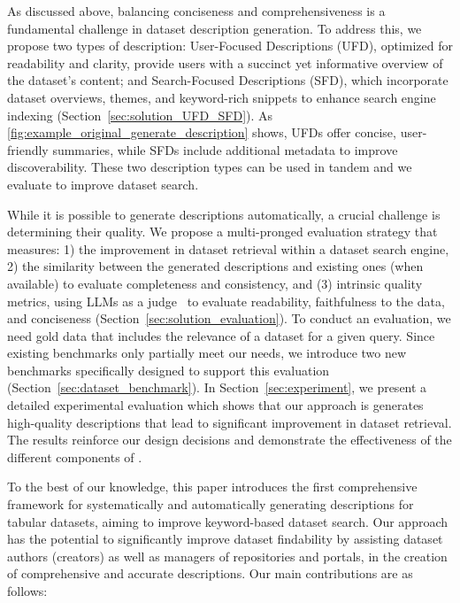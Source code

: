As discussed above, balancing conciseness and comprehensiveness is a fundamental challenge in dataset description generation. To address this, we propose two types of description: User-Focused Descriptions (UFD),
optimized for readability and clarity, provide users with a succinct yet informative overview of the dataset’s content; and Search-Focused Descriptions (SFD), which incorporate dataset overviews, themes, and keyword-rich snippets to enhance search engine indexing (Section~\ref{sec:solution_UFD_SFD}). As \autoref{fig:example_original_generate_description} shows,
UFDs offer concise, user-friendly summaries, while SFDs include additional metadata to improve discoverability.
These two description types can be used in tandem and we evaluate to improve dataset search.

While it is possible to generate descriptions automatically, a crucial challenge is determining their quality.
%
We propose a multi-pronged evaluation strategy that measures: 1)  the improvement in dataset
retrieval within a dataset search engine, 2) the similarity between the generated
descriptions and existing ones (when available) to evaluate completeness and consistency, and (3) intrinsic quality metrics, using LLMs as a judge~\cite{liu2023geval, gao2024llmEval, seo2024unveiling, zhao2023investigating} to evaluate readability, faithfulness to the data,
and conciseness (Section~\ref{sec:solution_evaluation}). 
% 
To conduct an evaluation, we need gold data that includes the relevance of a dataset for a given query. 
% 
% 
% 
Since existing benchmarks only partially meet our needs, we introduce two new benchmarks specifically designed to support this evaluation (Section~\ref{sec:dataset_benchmark}).
%
In Section~\ref{sec:experiment}, we present a detailed experimental evaluation which shows that our approach is generates high-quality descriptions that lead to significant improvement in dataset retrieval. The results reinforce our design decisions and demonstrate the effectiveness of the different components of \SystemName.   

%
To the best of our knowledge, this paper introduces the first comprehensive framework for systematically and automatically generating descriptions for tabular datasets, aiming to improve keyword-based dataset search. Our approach has the potential to significantly improve dataset findability by assisting dataset authors (creators) as well as managers of repositories and portals, in the creation of comprehensive and accurate descriptions.
%
Our main contributions are as follows:

